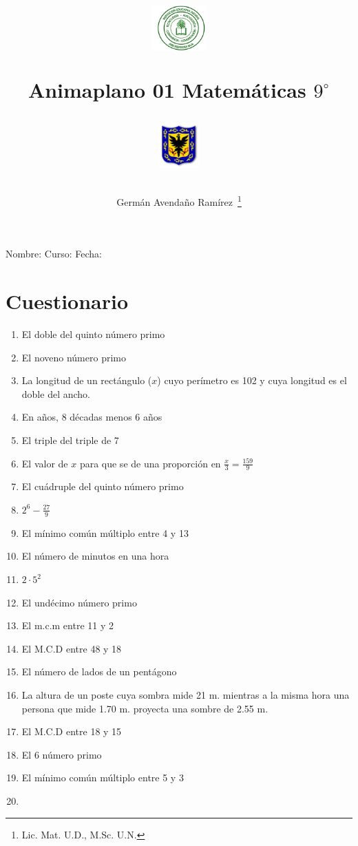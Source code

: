 \documentclass[letterpaper,11pt,twoside]{article}
\author{Germ\'an Avenda\~no Ram\'irez~\thanks{Lic. Mat. U.D., M.Sc. U.N.}}
\title{\begin{minipage}{.2\textwidth}
\includegraphics[height=1.75cm]{Images/logo-colegio.png}\end{minipage}
\begin{minipage}{.55\textwidth}
\begin{center}
Animaplano 01
Matemáticas $9^{\circ}$
\end{center}
\end{minipage}\hfill
\begin{minipage}{.2\textwidth}
\includegraphics[height=1.75cm]{Images/logo-sed.png} 
\end{minipage}}
\date{}
\begin{document}
\maketitle
Nombre: \hrulefill Curso: \underline{\hspace*{44pt}} Fecha: \underline{\hspace*{2.5cm}}
\section*{Cuestionario}
\begin{enumerate}
\item El doble del quinto n\'{u}mero primo
\item El noveno n\'{u}mero primo
\item La longitud de un rect\'{a}ngulo ($x$) cuyo per\'{i}metro es 102 y cuya longitud es el doble del ancho.
\item En años, 8 décadas menos 6 años
\item El triple del triple de 7
\item El valor de $x$ para que se de una proporci\'{o}n en $\frac{x}{3}=\frac{159}{9}$
\item El cuádruple del quinto número primo
\item $2^{6}-\frac{27}{9}$
\item El mínimo común múltiplo entre 4 y 13
\item El número de minutos en una hora
\item $2\cdot 5^{2}$
\item El undécimo número primo
\item El m.c.m entre 11 y 2
\item El M.C.D entre 48 y 18
\item El número de lados de un pentágono
\item La altura de un poste cuya sombra mide 21 m. mientras a la misma hora una persona que mide 1.70 m. proyecta una sombre de 2.55 m.
\item El M.C.D entre 18 y 15
\item El 6 número primo
\item El mínimo común múltiplo entre 5 y 3
\item 
\end{enumerate}
\end{document}
